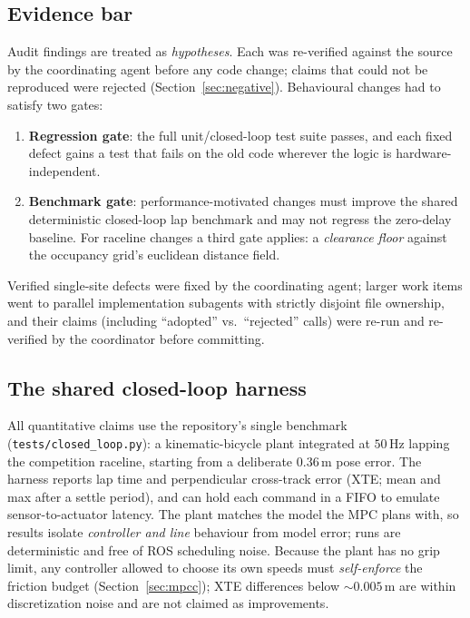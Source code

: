 \documentclass[11pt]{article}
\begin{document}
\subsection{Evidence bar}

Audit findings are treated as \emph{hypotheses}.  Each was re-verified
against the source by the coordinating agent before any code change;
claims that could not be reproduced were rejected
(Section~\ref{sec:negative}).  Behavioural changes had to satisfy two
gates:
\begin{enumerate}
  \item \textbf{Regression gate}: the full unit/closed-loop test suite
        passes, and each fixed defect gains a test that fails on the old
        code wherever the logic is hardware-independent.
  \item \textbf{Benchmark gate}: performance-motivated changes must
        improve the shared deterministic closed-loop lap benchmark and
        may not regress the zero-delay baseline.  For raceline changes
        a third gate applies: a \emph{clearance floor} against the
        occupancy grid's euclidean distance field.
\end{enumerate}
Verified single-site defects were fixed by the coordinating agent;
larger work items went to parallel implementation subagents with
strictly disjoint file ownership, and their claims (including
``adopted'' vs.\ ``rejected'' calls) were re-run and re-verified by the
coordinator before committing.

\subsection{The shared closed-loop harness}
\label{sec:harness}

All quantitative claims use the repository's single benchmark
(\texttt{tests/closed\_loop.py}): a kinematic-bicycle plant integrated
at $50\,\mathrm{Hz}$ lapping the competition raceline, starting from a
deliberate $0.36\,\mathrm{m}$ pose error.  The harness reports lap time
and perpendicular cross-track error (XTE; mean and max after a settle
period), and can hold each command in a FIFO to emulate
sensor-to-actuator latency.  The plant matches the model the MPC plans
with, so results isolate \emph{controller and line} behaviour from model
error; runs are deterministic and free of ROS scheduling noise.  Because
the plant has no grip limit, any controller allowed to choose its own
speeds must \emph{self-enforce} the friction budget
(Section~\ref{sec:mpcc}); XTE differences below
${\sim}0.005\,\mathrm{m}$ are within discretization noise and are not
claimed as improvements.
\end{document}
